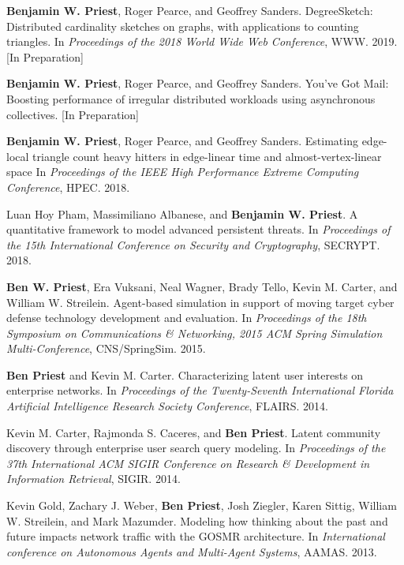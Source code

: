 \documentclass[10pt]{article}
\begin{document}
\begin{bibenum}

\item \textbf{Benjamin W. Priest}, Roger Pearce, and Geoffrey Sanders.
	DegreeSketch: Distributed cardinality sketches on graphs, with applications to counting triangles.
	In \emph{Proceedings of the 2018 World Wide Web Conference}, 
	WWW.
	2019.
	[In Preparation]

\item \textbf{Benjamin W. Priest}, Roger Pearce, and Geoffrey Sanders.
	You've Got Mail: Boosting performance of irregular distributed workloads using asynchronous collectives.
	[In Preparation]

\item \textbf{Benjamin W. Priest}, Roger Pearce, and Geoffrey Sanders.
	Estimating edge-local triangle count heavy hitters in edge-linear time and almost-vertex-linear space
	In \emph{Proceedings of the IEEE High Performance Extreme Computing Conference}, 
	HPEC. 
	2018.

\item Luan Hoy Pham, Massimiliano Albanese, and \textbf{Benjamin W. Priest}.
	A quantitative framework to model advanced persistent threats.
	In \emph{Proceedings of the 15th International Conference on Security and Cryptography}, 
	SECRYPT. 
	2018.

\item \textbf{Ben W. Priest}, Era Vuksani, Neal Wagner, Brady Tello, Kevin M. Carter, and William W. Streilein. 
	Agent-based simulation in support of moving target cyber defense technology development and evaluation.
	In \emph{Proceedings of the 18th Symposium on Communications \& Networking, 2015 ACM Spring Simulation Multi-Conference}, 
	CNS/SpringSim. 
	2015.

\item \textbf{Ben Priest} and Kevin M. Carter.
	Characterizing latent user interests on enterprise networks.
	In \emph{Proceedings of the Twenty-Seventh International Florida Artificial Intelligence Research Society Conference}, 
	FLAIRS. 
	2014.

\item Kevin M. Carter, Rajmonda S. Caceres, and \textbf{Ben Priest}.
	Latent community discovery through enterprise user search query modeling.
	In \emph{Proceedings of the 37th International ACM SIGIR Conference on Research \& Development in Information Retrieval}, 
	SIGIR. 
	2014.

\item Kevin Gold, Zachary J. Weber, \textbf{Ben Priest}, Josh Ziegler, Karen Sittig, William W. Streilein, and Mark Mazumder.
	Modeling how thinking about the past and future impacts network traffic with the GOSMR architecture.
	In \emph{International conference on Autonomous Agents and Multi-Agent Systems}, 
	AAMAS. 
	2013.


\end{bibenum}
\end{document}

